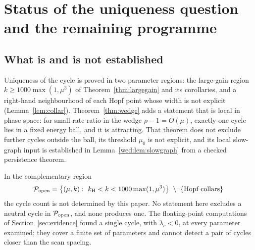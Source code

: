 \section{Status of the uniqueness question and the remaining programme}\label{sec:status}
\subsection{What is and is not established}
Uniqueness of the cycle is proved in two parameter regions: the large-gain region $k\ge1000\max(1,\mu^3)$ of Theorem~\ref{thm:largegain} and its corollaries, and a right-hand neighbourhood of each Hopf point whose width is not explicit (Lemma~\ref{lem:collar}). Theorem~\ref{thm:wedge} adds a statement that is local in phase space: for small rate ratio in the wedge $\rho-1=O(\mu)$, exactly one cycle lies in a fixed energy ball, and it is attracting. That theorem does not exclude further cycles outside the ball, its threshold $\mu_0$ is not explicit, and its local slow-graph input is established in Lemma~\ref{wed:lem:slowgraph} from a checked persistence theorem.

In the complementary region
\begin{equation}\label{eq:openregion}
\cP_{\rm open}=\bigl\{(\mu,k):\ \kH<k<1000\max(1,\mu^3)\bigr\}\ \setminus\ \{\text{Hopf collars}\}
\end{equation}
the cycle count is not determined by this paper. No statement here excludes a neutral cycle in $\mathcal P_{\rm open}$, and none produces one. The floating-point computations of Section~\ref{sec:evidence} found a single cycle, with $\lambda_c<0$, at every parameter examined; they cover a finite set of parameters and cannot detect a pair of cycles closer than the scan spacing.


